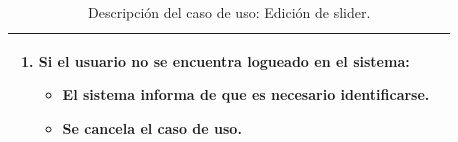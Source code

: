 \begin{table}[H]
\begin{center}
\begin{tabular}{|p{3.5cm}|p{10cm}|}
{\begin{enumerate}
\begin{itemize}
	    \item Se cancela el caso de uso.
	  \end{itemize}
	\item Si el usuario no se encuentra logueado en el sistema:
	\begin{itemize}
	  \item El sistema informa de que es necesario identificarse.
	  \item Se cancela el caso de uso.
	\end{itemize}
	\end{enumerate}
	}\\
      \hline
    \end{tabular}
  \end{center}
\caption{Descripción del caso de uso: Edición de slider.}
\end{table}


